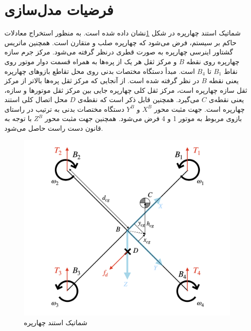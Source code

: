 \section{فرضیات مدل‌سازی}
شماتیک استند چهارپره در شكل \ref{QuadAssum}نشان داده شده است. به ‌منظور استخراج معادلات حاکم بر سیستم، 
فرض می‌شود که چهارپره صلب و متقارن است. همچنین ماتریس گشتاور اینرسی چهارپره به صورت قطری درنظر گرفته می‌شود. مرکز جرم سازه چهارپره روی نقطه $B$ و مرکز ثقل هر یک از پره‌ها به همراه قسمت دوار موتور روی نقاط 
$B_1$
تا
$B_4$
است. مبدأ دستگاه مختصات بدنی روی محل تقاطع بازوهای چهارپره یعنی نقطه 
$B$
در نظر گرفته شده است. از آنجایی ‌که مرکز ثقل پره‌ها بالاتر از مرکز ثقل سازه چهارپره است، مرکز ثقل کلی چهارپره جایی بین مرکز ثقل موتورها و سازه، یعنی نقطه‌ی 
$C$
می‌گیرد. همچنین قابل ذکر است که نقطه‌ی
$D$
محل اتصال کلی استند چهارپره است. جهت مثبت محور 
$X^B$
و
$Y^B$
دستگاه مختصات بدنی به ترتیب در راستای بازوی مربوط به موتور 1 و 4 فرض می‌شود. همچنین جهت مثبت محور
$Z^B$
با توجه به قانون دست راست حاصل می‌شود.
\begin{figure}[H]\label{QuadAssum}
	\includegraphics[width=12cm]{../Figures/Forces/StandAssumations.png}
	\centering
	\caption{شماتیک استند چهارپره}
\end{figure}